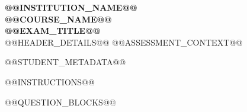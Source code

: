 \documentclass[11pt,a4paper]{article}
\begin{document}
\begin{center}
{\Large \textbf{@@INSTITUTION_NAME@@}}\\
{\large \textbf{@@COURSE_NAME@@}}\\
{\large \textbf{@@EXAM_TITLE@@}}\\
@@HEADER_DETAILS@@
@@ASSESSMENT_CONTEXT@@
\end{center}

@@STUDENT_METADATA@@

@@INSTRUCTIONS@@

@@QUESTION_BLOCKS@@
\end{document}
